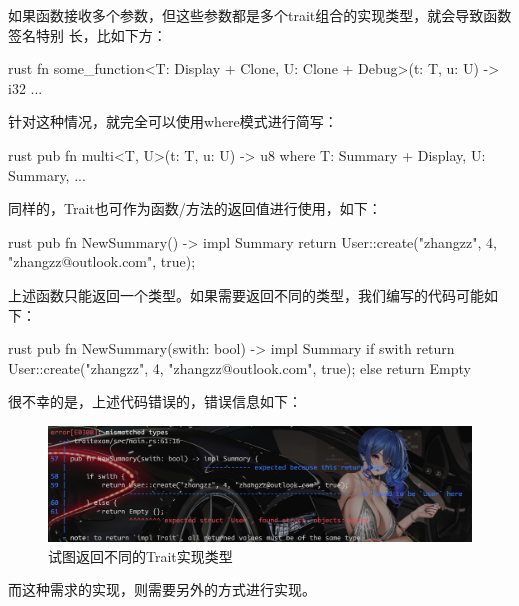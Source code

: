 如果函数接收多个参数，但这些参数都是多个trait组合的实现类型，就会导致函数签名特别
长，比如下方：
\begin{code-block}{rust}
fn some_function<T: Display + Clone, U: Clone + Debug>(t: T, u: U) -> i32 {
    ...
}
\end{code-block}
针对这种情况，就完全可以使用where模式进行简写：
\begin{code-block}{rust}
pub fn multi<T, U>(t: T, u: U) -> u8
where
    T: Summary + Display,
    U: Summary,
{
    ...
}
\end{code-block}

同样的，Trait也可作为函数/方法的返回值进行使用，如下：
\begin{code-block}{rust}
pub fn NewSummary() -> impl Summary {
    return User::create("zhangzz", 4, "zhangzz@outlook.com", true);
}
\end{code-block}
上述函数只能返回一个类型。如果需要返回不同的类型，我们编写的代码可能如下：
\begin{code-block}{rust}
pub fn NewSummary(swith: bool) -> impl Summary {
    if swith {
        return User::create("zhangzz", 4, "zhangzz@outlook.com", true);
    } else {
        return Empty{}
    }
}
\end{code-block}
很不幸的是，上述代码错误的，错误信息如下：
\begin{figure}[H]
  \centering
  \includegraphics[scale=0.3]{rust_trait_return.png}
  \caption{试图返回不同的Trait实现类型}
  \label{fig:rust_trait_return}
\end{figure}
而这种需求的实现，则需要另外的方式进行实现。

